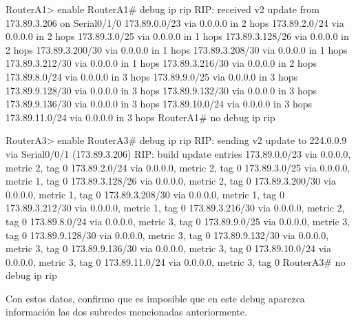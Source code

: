 \begin{listing}[style=consola]
RouterA1> enable
RouterA1# debug ip rip
RIP: received v2 update from 173.89.3.206 on Serial0/1/0
      173.89.0.0/23 via 0.0.0.0 in 2 hops
      173.89.2.0/24 via 0.0.0.0 in 2 hops
      173.89.3.0/25 via 0.0.0.0 in 1 hops
      173.89.3.128/26 via 0.0.0.0 in 2 hops
      173.89.3.200/30 via 0.0.0.0 in 1 hops
      173.89.3.208/30 via 0.0.0.0 in 1 hops
      173.89.3.212/30 via 0.0.0.0 in 1 hops
      173.89.3.216/30 via 0.0.0.0 in 2 hops
      173.89.8.0/24 via 0.0.0.0 in 3 hops
      173.89.9.0/25 via 0.0.0.0 in 3 hops
      173.89.9.128/30 via 0.0.0.0 in 3 hops
      173.89.9.132/30 via 0.0.0.0 in 3 hops
      173.89.9.136/30 via 0.0.0.0 in 3 hops
      173.89.10.0/24 via 0.0.0.0 in 3 hops
      173.89.11.0/24 via 0.0.0.0 in 3 hops
RouterA1# no debug ip rip
\end{listing} 
\begin{listing}[style=consola]
RouterA3> enable
RouterA3# debug ip rip
RIP: sending  v2 update to 224.0.0.9 via Serial0/0/1 (173.89.3.206)
RIP: build update entries
      173.89.0.0/23 via 0.0.0.0, metric 2, tag 0
      173.89.2.0/24 via 0.0.0.0, metric 2, tag 0
      173.89.3.0/25 via 0.0.0.0, metric 1, tag 0
      173.89.3.128/26 via 0.0.0.0, metric 2, tag 0
      173.89.3.200/30 via 0.0.0.0, metric 1, tag 0
      173.89.3.208/30 via 0.0.0.0, metric 1, tag 0
      173.89.3.212/30 via 0.0.0.0, metric 1, tag 0
      173.89.3.216/30 via 0.0.0.0, metric 2, tag 0
      173.89.8.0/24 via 0.0.0.0, metric 3, tag 0
      173.89.9.0/25 via 0.0.0.0, metric 3, tag 0
      173.89.9.128/30 via 0.0.0.0, metric 3, tag 0
      173.89.9.132/30 via 0.0.0.0, metric 3, tag 0
      173.89.9.136/30 via 0.0.0.0, metric 3, tag 0
      173.89.10.0/24 via 0.0.0.0, metric 3, tag 0
      173.89.11.0/24 via 0.0.0.0, metric 3, tag 0
RouterA3# no debug ip rip
\end{listing} 

\par Con estos datos, confirmo que es imposible que en este debug aparezca información las dos subredes mencionadas anteriormente. \\


